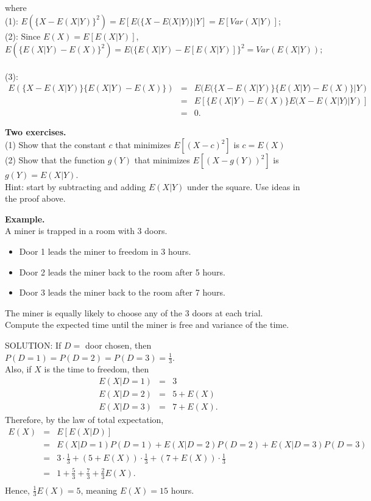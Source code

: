 \documentclass[12pt]{article}
\begin{document}
\noindent where\\
\vspace{0.05cm}
(1): $E(\{X-E(X|Y)\}^2) = E[E(\{X-E(X|Y)\}|Y]=E[Var(X|Y)]$;\\
\vspace{0.05cm}
(2): Since $E(X) = E[E(X|Y)]$,
$$E(\{E(X|Y)-E(X)\}^2) = E(\{E(X|Y)-E[E(X|Y)]\}^2 = Var(E(X|Y));$$\\
\vspace{0.05cm}
(3):
\begin{eqnarray*}
E(\{X-E(X|Y)\}\{E(X|Y) - E(X)\}) &=& E(E(\{X-E(X|Y)\}\{E(X|Y)-E(X)\}|Y)\\
&=& E[\{E(X|Y)-E(X)\}E(X-E(X|Y)|Y)]\\
&=& 0.
\end{eqnarray*}

\vspace{0.5cm}
\noindent \textbf{Two exercises.} \\
(1) Show that the constant $c$ that minimizes $E[(X-c)^2]$ is $c=E(X)$\\
(2) Show that the function $g(Y)$ that minimizes $E[(X-g(Y))^2]$ is $g(Y) = E(X|Y)$.\\
Hint: start by subtracting and adding $E(X|Y)$ under the square. Use ideas in the proof above.

\vspace{0.5cm}
\noindent \textbf{Example.} \\
A miner is trapped in a room with 3 doors.
\begin{itemize}
\item Door 1 leads the miner to freedom in 3 hours.
\item Door 2 leads the miner back to the room after 5 hours.
\item Door 3 leads the miner back to the room after 7 hours.
\end{itemize}
The miner is equally likely to choose any of the 3 doors at each trial.\\
Compute the expected time until the miner is free and variance of the time.
\vspace{0.25cm}

\noindent SOLUTION:
If $D=$ door chosen, then $P(D=1)=P(D=2)=P(D=3)=\frac{1}{3}$.\\
Also, if $X$ is the time to freedom, then
\begin{eqnarray*}
E(X|D=1) &=& 3\\
E(X|D=2) &=& 5+E(X)\\
E(X|D=3) &=& 7+E(X).
\end{eqnarray*}
Therefore, by the law of total expectation,
\begin{eqnarray*}
E(X) &=& E[E(X|D)]\\
&=& E(X|D=1)P(D=1) + E(X|D=2)P(D=2) + E(X|D=3)P(D=3) \\
&=& 3 \cdot \frac{1}{3} + (5+E(X))\cdot \frac{1}{3} + (7+E(X)) \cdot \frac{1}{3}\\
&=& 1 + \frac{5}{3} + \frac{7}{3} + \frac{2}{3}E(X).\\
\end{eqnarray*}
Hence, $\frac{1}{3}E(X) = 5$, meaning $E(X) = 15$ hours.\\
\end{document}
